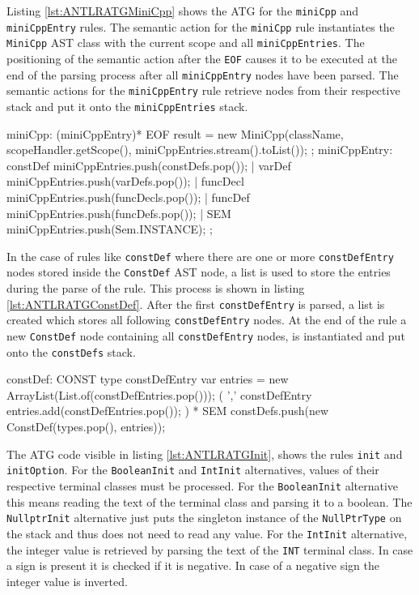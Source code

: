 Listing \ref{lst:ANTLRATGMiniCpp} shows the ATG for the \verb|miniCpp| and \verb|miniCppEntry| rules. The semantic action for the \verb|miniCpp| rule instantiates the \verb|MiniCpp| AST class with the current scope and all \verb|miniCppEntries|. The positioning of the semantic action after the \verb|EOF| causes it to be executed at the end of the parsing process after all \verb|miniCppEntry| nodes have been parsed. The semantic actions for the \verb|miniCppEntry| rule retrieve nodes from their respective stack and put it onto the \verb|miniCppEntries| stack.   

\begin{AntlrCode}[float,numbers=none,caption=ATG for the \texttt{miniCpp} and \texttt{miniCppEntry} rules., label=lst:ANTLRATGMiniCpp]
    miniCpp: (miniCppEntry)* EOF                    
    { result = new MiniCpp(className, scopeHandler.getScope(), miniCppEntries.stream().toList()); }
    ;
miniCppEntry:     
      constDef                  { miniCppEntries.push(constDefs.pop()); }
    | varDef                    { miniCppEntries.push(varDefs.pop()); }
    | funcDecl                  { miniCppEntries.push(funcDecls.pop()); }
    | funcDef                   { miniCppEntries.push(funcDefs.pop()); }
    | SEM                       { miniCppEntries.push(Sem.INSTANCE); }
;
\end{AntlrCode}
    

In the case of rules like \verb|constDef| where there are one or more \verb|constDefEntry| nodes stored inside the \verb|ConstDef| AST node, a list is used to store the entries during the parse of the rule. This process is shown in listing \ref{lst:ANTLRATGConstDef}. After the first \verb|constDefEntry| is parsed, a list is created which stores all following \verb|constDefEntry| nodes.
At the end of the rule a new \verb|ConstDef| node containing all \verb|constDefEntry| nodes, is instantiated and put onto the \verb|constDefs| stack.



\begin{AntlrCode}[float,numbers=none,caption=ATG for the \texttt{constDef} rule., label=lst:ANTLRATGConstDef]
constDef:    
    CONST type constDefEntry          
        { var entries = new ArrayList(List.of(constDefEntries.pop())); }
    (
        ',' constDefEntry           
        { entries.add(constDefEntries.pop());}
    ) 
    * SEM
        { constDefs.push(new ConstDef(types.pop(), entries)); }
\end{AntlrCode}


The ATG code visible in listing \ref{lst:ANTLRATGInit}, shows the rules \verb|init| and \verb|initOption|. For the \verb|BooleanInit| and \verb|IntInit| alternatives, values of their respective terminal classes must be processed. For the \verb|BooleanInit| alternative this means reading the text of the terminal class and parsing it to a boolean. The \verb|NullptrInit| alternative just puts the singleton instance of the \verb|NullPtrType| on the stack and thus does not need to read any value. For the \verb|IntInit| alternative, the integer value is retrieved by parsing the text of the \verb|INT| terminal class. In case a sign is present it is checked if it is negative. In case of a negative sign the integer value is inverted. 

